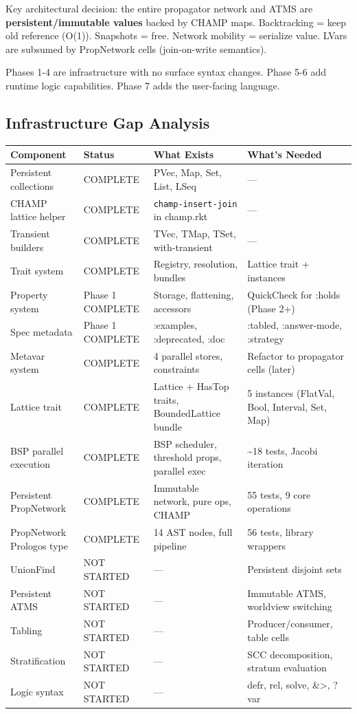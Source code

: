 \documentclass[11pt]{article}
\begin{document}
Key architectural decision: the entire propagator network and ATMS are
\textbf{persistent/immutable values} backed by CHAMP maps. Backtracking = keep
old reference (O(1)). Snapshots = free. Network mobility = serialize value.
LVars are subsumed by PropNetwork cells (join-on-write semantics).

Phases 1-4 are infrastructure with no surface syntax changes. Phase 5-6
add runtime logic capabilities. Phase 7 adds the user-facing language.
\subsection{Infrastructure Gap Analysis}
\label{sec:orgc6271d8}

\begin{center}
\begin{tabular}{llll}
Component & Status & What Exists & What's Needed\\
\hline
Persistent collections & COMPLETE & PVec, Map, Set, List, LSeq & —\\
CHAMP lattice helper & COMPLETE & \texttt{champ-insert-join} in champ.rkt & —\\
Transient builders & COMPLETE & TVec, TMap, TSet, with-transient & —\\
Trait system & COMPLETE & Registry, resolution, bundles & Lattice trait + instances\\
Property system & Phase 1 COMPLETE & Storage, flattening, accessors & QuickCheck for :holds (Phase 2+)\\
Spec metadata & Phase 1 COMPLETE & :examples, :deprecated, :doc & :tabled, :answer-mode, :strategy\\
Metavar system & COMPLETE & 4 parallel stores, constraints & Refactor to propagator cells (later)\\
Lattice trait & COMPLETE & Lattice + HasTop traits, BoundedLattice bundle & 5 instances (FlatVal, Bool, Interval, Set, Map)\\
BSP parallel execution & COMPLETE & BSP scheduler, threshold props, parallel exec & \textasciitilde{}18 tests, Jacobi iteration\\
Persistent PropNetwork & COMPLETE & Immutable network, pure ops, CHAMP & 55 tests, 9 core operations\\
PropNetwork Prologos type & COMPLETE & 14 AST nodes, full pipeline & 56 tests, library wrappers\\
UnionFind & NOT STARTED & — & Persistent disjoint sets\\
Persistent ATMS & NOT STARTED & — & Immutable ATMS, worldview switching\\
Tabling & NOT STARTED & — & Producer/consumer, table cells\\
Stratification & NOT STARTED & — & SCC decomposition, stratum evaluation\\
Logic syntax & NOT STARTED & — & defr, rel, solve, \&>, ?var\\
\end{tabular}
\end{center}
\end{document}
